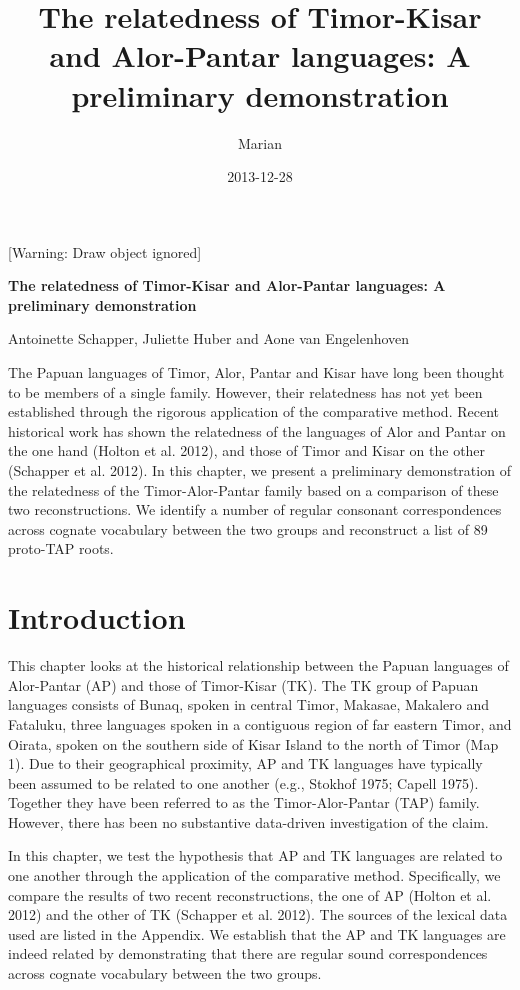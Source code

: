 \documentclass[a4paper]{article}
\title{The relatedness of Timor-Kisar and Alor-Pantar languages: A preliminary demonstration}
\author{Marian}
\date{2013-12-28}
\begin{document}
[Warning: Draw object ignored]\clearpage\setcounter{page}{1}\pagestyle{Standard}
{\centering\bfseries
The relatedness of Timor-Kisar and Alor-Pantar languages: A preliminary demonstration
\par}

{\centering
Antoinette Schapper, Juliette Huber and Aone van Engelenhoven
\par}

The Papuan languages of Timor, Alor, Pantar and Kisar have long been thought to be members of a single family. However, their relatedness has not yet been established through the rigorous application of the comparative method. Recent historical work has shown the relatedness of the languages of Alor and Pantar on the one hand (Holton et al. 2012), and those of Timor and Kisar on the other (Schapper et al. 2012). In this chapter, we present a preliminary demonstration of the relatedness of the Timor-Alor-Pantar family based on a comparison of these two reconstructions. We identify a number of regular consonant correspondences across cognate vocabulary between the two groups and reconstruct a list of 89 proto-TAP roots. 

\section[Introduction]{Introduction}
This chapter looks at the historical relationship between the Papuan languages of Alor-Pantar (AP) and those of Timor-Kisar (TK). The TK group of Papuan languages consists of Bunaq, spoken in central Timor, Makasae, Makalero and Fataluku, three languages spoken in a contiguous region of far eastern Timor, and Oirata, spoken on the southern side of Kisar Island to the north of Timor (Map 1). Due to their geographical proximity, AP and TK languages have typically been assumed to be related to one another (e.g., Stokhof 1975; Capell 1975). Together they have been referred to as the Timor-Alor-Pantar (TAP) family. However, there has been no substantive data-driven investigation of the claim.

In this chapter, we test the hypothesis that AP and TK languages are related to one another through the application of the comparative method. Specifically, we compare the results of two recent reconstructions, the one of AP (Holton et al. 2012) and the other of TK (Schapper et al. 2012). The sources of the lexical data used are listed in the Appendix. We establish that the AP and TK languages are indeed related by demonstrating that there are regular sound correspondences across cognate vocabulary between the two groups. 
\end{document}
